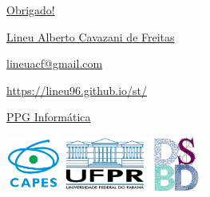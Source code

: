 \documentclass[10pt,
  aspectratio=169,
  serif,
  mathserif,
  professionalfont,
  compress,
  handout,
  ]{beamer}\usepackage[]{graphicx}\usepackage[]{color}
\begin{document}
\begin{frame}[c, allowframebreaks]

\begin{center}

  {\huge \href{https://lineu96.github.io/st/}{Obrigado!}}
  
  \vspace{0.5cm}
    
  {\normalsize \href{https://lineu96.github.io/st/}{Lineu Alberto Cavazani de Freitas}}
  
  {\normalsize \href{https://lineu96.github.io/st/}{lineuacf@gmail.com}}
  
  {\normalsize \href{https://lineu96.github.io/st/}{https://lineu96.github.io/st/}}
  
  {\normalsize \href{http://www.prppg.ufpr.br/ppginformatica/?lang=pb}{PPG Informática}}

\end{center}

\begin{center}
  \includegraphics[height=1.8cm]{img/capes_tp2.png}\hspace{2em}
  \includegraphics[height=1.8cm]{img/ufpr-transparent.png}\hspace{2em}
  \includegraphics[height=1.8cm]{img/dsbd-2x2-trans.png}
\end{center}

\end{frame}

\end{document}
